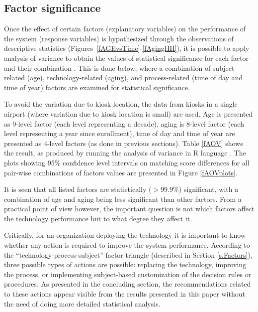 \documentclass{cta-author}%
\newcommand{\cmt}[1]{}
\begin{document}
\subsection{Factor significance}

Once the effect of certain factors (explanatory variables) on the performance of the system (response variables) is hypothesized through the observations of descriptive statistics (Figures~\ref{fAGEvsTime}-\ref{fAgingHH}), it is possible to apply analysis of variance  to 
obtain the values of statistical significance for each factor and their combination \cite{R-book}.
This is done below, where 
a combination of subject-related (age), technology-related (aging), and process-related (time of day and time of year) factors are examined for statistical significance.
 
To avoid the variation due to kiosk location, the data from kiosks in a single airport (where variation due to kiosk location is small) are used. Age is presented as 9-level factor (each level representing a decade), aging is 8-level  factor (each level representing a year since enrollment), time of day and time of year are presented as 4-level factors (as done in previous sections).
Table \ref{fAOV} shows the result, as produced by running the analysis of variance in R language \cite{R-book}.
The plots showing 95\% \cmt{factor-wise} confidence level intervals on matching score differences for all pair-wise combinations of factors values %
are presented in Figure \ref{fAOVplots}. 


It is seen that all listed factors are statistically ($>99.9\%$) significant, 
with a combination of age and aging being  less significant than other factors. %
From a practical point of view however,
the important question is not which factors affect the technology performance but to what degree they affect it. 

Critically, for an organization  deploying the technology it is important to know  whether any action is required to improve the system performance. 
According to the ``technology-process-subject'' factor triangle (described in Section \ref{s.Factors}), three possible types of actions are possible: 
replacing the technology, improving the process, or implementing subject-based customization of the decision rules or procedures. 
As presented in the concluding section, the recommendations related to these actions appear visible from the results presented in this paper without the need of doing more detailed statistical analysis. 
\end{document}
